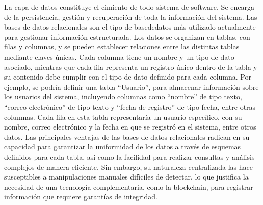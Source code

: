 La capa de datos constituye el cimiento de todo sistema de software. Se encarga de la persistencia, gestión y recuperación de toda la información del sistema. Las bases de datos relacionales son el tipo de \gls{basededatos} más utilizado actualmente para gestionar información estructurada. Los datos se organizan en tablas, con filas y columnas, y se pueden establecer relaciones entre las distintas tablas mediante claves únicas. Cada columna tiene un nombre y un tipo de dato asociado, mientras que cada fila representa un registro único dentro de la tabla y su contenido debe cumplir con el tipo de dato definido para cada columna. Por ejemplo, se podría definir una tabla ``Usuario'', para almacenar información sobre los usuarios del sistema, incluyendo columnas como ``nombre'' de tipo texto, ``correo electrónico'' de tipo texto y ``fecha de registro'' de tipo fecha, entre otras columnas. Cada fila en esta tabla representaría un usuario específico, con su nombre, correo electrónico y la fecha en que se registró en el sistema, entre otros datos. Las principales ventajas de las bases de datos relacionales radican en su capacidad para garantizar la uniformidad de los datos a través de esquemas definidos para cada tabla, así como la facilidad para realizar consultas y análisis complejos de manera eficiente. Sin embargo, su naturaleza centralizada las hace susceptibles a manipulaciones manuales difíciles de detectar, lo que justifica la necesidad de una tecnología complementaria, como la blockchain, para registrar información que requiere garantías de integridad.

